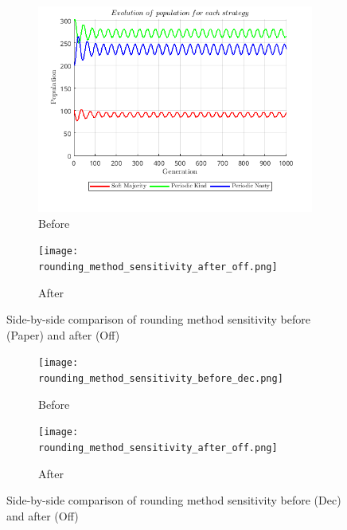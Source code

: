 \documentclass[12pt]{report}
\begin{document}
\begin{figure}[H]
    \centering
    \begin{subfigure}[t]{0.45\textwidth}
        \centering
        \includegraphics[width=\textwidth]{rounding_method_sensitivity_before_paper.png}
        \caption{Before}
    \end{subfigure}
    \hfill
    \begin{subfigure}[t]{0.45\textwidth}
        \centering
        \texttt{[image: rounding\_method\_sensitivity\_after\_off.png]}
        \caption{After}
    \end{subfigure}
    \caption{Side-by-side comparison of rounding method sensitivity before (Paper) and after (Off)}
\end{figure}
\begin{figure}[H]
 \begin{subfigure}[t]{0.45\textwidth}
        \centering
        \texttt{[image: rounding\_method\_sensitivity\_before\_dec.png]}
        \caption{Before}
    \end{subfigure}
    \hfill
    \begin{subfigure}[t]{0.45\textwidth}
        \centering
        \texttt{[image: rounding\_method\_sensitivity\_after\_off.png]}
        \caption{After}
    \end{subfigure}
    \caption{Side-by-side comparison of rounding method sensitivity before (Dec) and after (Off)}
\end{figure}
\end{document}
